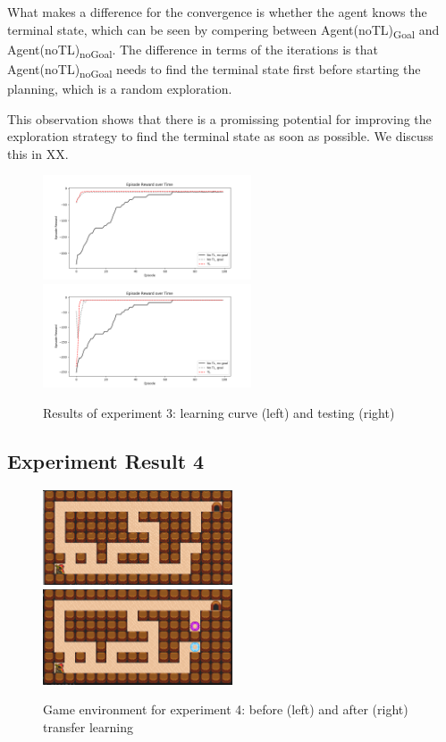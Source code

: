 What makes a difference for the convergence is whether the agent knows the terminal state, which can be seen by compering between Agent(noTL)\textsubscript{Goal} and Agent(noTL)\textsubscript{noGoal}.
The difference in terms of the iterations is that Agent(noTL)\textsubscript{noGoal} needs to find the terminal state first before starting the planning, which is a random exploration.

This observation shows that there is a promissing potential for improving the exploration strategy to find the terminal state as soon as possible.
We discuss this in XX.

\begin{figure}[!htb]
\centerline{
\includegraphics[width=0.55\textwidth]{./figures/experiment3_after_training}
\includegraphics[width=0.55\textwidth]{./figures/experiment3_after_test}
}
\caption{Results of experiment 3: learning curve (left) and testing (right)}
\label{experiment3_training}
\end{figure}

\subsection{Experiment Result 4}
\label{subsec:experiment_result_4}

\begin{figure}[!htb]
\centerline{
\includegraphics[width=0.5\textwidth]{./figures/experiment4_before}
\includegraphics[width=0.5\textwidth]{./figures/experiment4_after}}
\caption{Game environment for experiment 4: before (left) and after (right) transfer learning}
\label{experiment5}
\end{figure}


